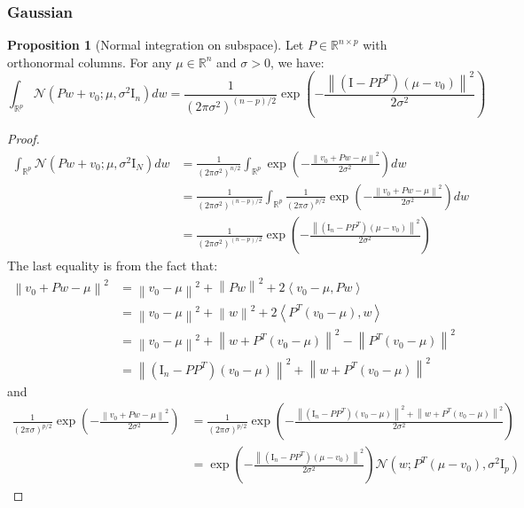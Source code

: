 \documentclass[a4paper,10pt]{article}
\theoremstyle{definition} %
\theoremstyle{definition} %
\newtheorem{proposition}[definition]{Proposition}
\theoremstyle{definition} %
\theoremstyle{definition} %
\newcommand{\R}{\mathbb{R}}
\newcommand{\Normal}[1]{\mathcal{N}\left( {#1} \right)}
\newcommand{\Id}{\mathrm{I}}
\newcommand{\norm}[1]{\left\| #1 \right \|}
\newcommand{\inner}[1]{\left\langle #1 \right\rangle}
\newcommand{\0}{\boldsymbol{0}}
\begin{document}
\subsubsection*{Gaussian}
\begin{proposition}[Normal integration on subspace]\label{prop:normal_on_subspace}
    Let $P \in \R^{n \times p}$ with orthonormal columns. For any $\mu \in \R^n$ and $\sigma > 0$, we have:
    \begin{equation*}
        \int_{\R^{p}} \Normal{P w + v_0; \mu, \sigma^2 \Id_{n}} dw = \frac{1}{(2 \pi \sigma^2)^{(n - p) / 2}} \exp \left( -\frac{\norm{(\Id - P P^T)(\mu - v_0)}^2}{2\sigma^2} \right)
    \end{equation*}
\end{proposition}
\begin{proof}
    \begin{align*}
        \int_{\R^{p}} \Normal{P w + v_0; \mu, \sigma^2 \Id_N} d w
        &= \frac{1}{(2\pi\sigma^2)^{n/2}} \int_{\R^{p}} \exp \left( -\frac{\norm{v_0 + P w - \mu}^2}{2 \sigma^2} \right) dw \\
        &= \frac{1}{(2\pi \sigma^2)^{(n - p)/2}} \int_{\R^{p}} \frac{1}{(2 \pi \sigma)^{p/2}} \exp \left( -\frac{\norm{v_0 + P w - \mu}^2}{2\sigma^2} \right) dw\\
        &= \frac{1}{(2\pi \sigma^2)^{(n - p)/2}} \exp \left( -\frac{\norm{(\Id_n - P P^T)(\mu - v_0)}^2}{2\sigma^2} \right)
    \end{align*}
    The last equality is from the fact that: 
    \begin{align*}
        \norm{v_0 + P w - \mu}^2 &= \norm{v_0 - \mu}^2 + \norm{P w}^2 + 2 \inner{v_0 - \mu, P w} \\ 
        &= \norm{v_0 - \mu}^2 + \norm{w}^2 + 2 \inner{P^T(v_0 - \mu), w} \\
        &= \norm{v_0 - \mu}^2 + \norm{w + P^T(v_0 - \mu)}^2 - \norm{P^T(v_0 - \mu)}^2 \\
        &= \norm{(\Id_n - P P^T)(v_0 - \mu)}^2 + \norm{w + P^T(v_0 - \mu)}^2
    \end{align*}
    and 
    \begin{align*}
        \frac{1}{(2 \pi \sigma)^{p/2}} \exp \left( -\frac{\norm{v_0 + P w - \mu}^2}{2\sigma^2} \right) &= \frac{1}{(2 \pi \sigma)^{p/2}} \exp \left( -\frac{ \norm{(\Id_n - P P^T)(v_0 - \mu)}^2 + \norm{w + P^T(v_0 - \mu)}^2}{2\sigma^2} \right) \\
        &= \exp \left( -\frac{\norm{(\Id_n - P P^T)(\mu - v_0)}^2}{2\sigma^2} \right) \Normal{w; P^T(\mu - v_0), \sigma^2 \Id_p} 
    \end{align*}
\end{proof}
\end{document}
